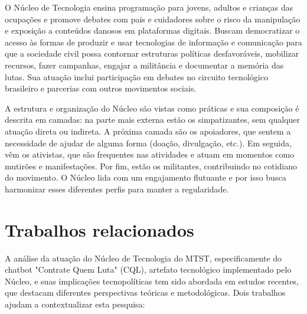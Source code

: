 O Núcleo de Tecnologia ensina programação para jovens, adultos e crianças das ocupações e promove debates com pais e cuidadores sobre o risco da manipulação e exposição a conteúdos danosos em plataformas digitais. Buscam democratizar o acesso às formas de produzir e usar tecnologias de informação e comunicação para que a sociedade civil possa contornar estruturas políticas desfavoráveis, mobilizar recursos, fazer campanhas, engajar a militância e documentar a memória das lutas. Sua atuação inclui participação em debates no circuito tecnológico brasileiro e parcerias com outros movimentos sociais.

A estrutura e organização do Núcleo são vistas como práticas e sua composição é descrita em camadas: na parte mais externa estão os simpatizantes, sem qualquer atuação direta ou indireta. A próxima camada são os apoiadores, que sentem a necessidade de ajudar de alguma forma (doação, divulgação, etc.). Em seguida, vêm os ativistas, que são frequentes nas atividades e atuam em momentos como mutirões e manifestações. Por fim, estão os militantes, contribuindo no cotidiano do movimento. O Núcleo lida com um engajamento flutuante e por isso busca harmonizar esses diferentes perfis para manter a regularidade.

\section{Trabalhos relacionados}
\label{sec:trabalhosrelacionados}

A análise da atuação do Núcleo de Tecnologia do MTST, especificamente do chatbot "Contrate Quem Luta" (CQL), artefato tecnológico implementado pelo Núcleo, e suas implicações tecnopolíticas tem sido abordada em estudos recentes, que destacam diferentes perspectivas teóricas e metodológicas. Dois trabalhos ajudam a contextualizar esta pesquisa:

